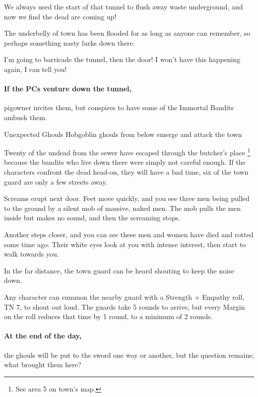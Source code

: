 \begin{multicols}{2}
\begin{speechtext}
  We always used the start of that tunnel to flush away waste underground, and now we find the dead are coming up!

  The underbelly of \gls{town} has been flooded for as long as anyone can remember, so perhaps something nasty lurks down there.

  I'm going to barricade the tunnel, then the door!
  I won't have this happening again, I can tell you!
\end{speechtext}

\paragraph{If the PCs venture down the tunnel,}
\gls{pigowner} invites them, but conspires to have some of the Immortal Bandits ambush them.

{\N\N Unexpected Ghouls}%
{Hobgoblin ghouls from below emerge and attack the town}%

Twenty of the undead from the sewer have escaped through the butcher's place%
\footnote{See area 5 on \gls{town}'s map.}
because the bandits who live down there were simply not careful enough.
If the characters confront the dead head-on, they will have a bad time, six of the town guard are only a few streets away.

\begin{boxtext}

  Screams erupt next door.
  Feet move quickly, and you see three men being pulled to the ground by a silent mob of massive, naked men.
  The mob pulls the men inside but makes no sound, and then the screaming stops.

  Another steps closer, and you can see these men and women have died and rotted some time ago.
  Their white eyes look at you with intense interest, then start to walk towards you.

  In the far distance, the town guard can be heard shouting to keep the noise down.

\end{boxtext}

Any character can summon the nearby guard with a Strength + Empathy roll, TN 7, to shout out loud.
The guards take 5 rounds to arrive, but every Margin on the roll reduces that time by 1 round, to a minimum of 2 rounds.


\paragraph{At the end of the day,}
the ghouls will be put to the sword one way or another, but the question remains; what brought them here?


\end{multicols}
